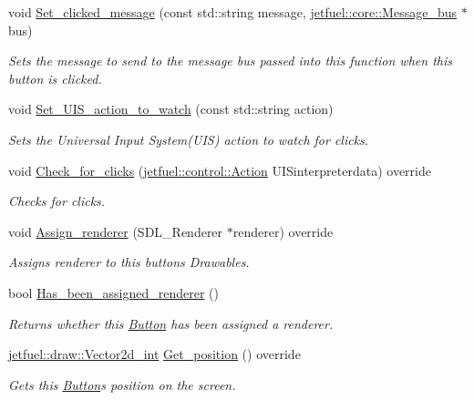 \begin{DoxyCompactItemize}
void \hyperlink{classjetfuel_1_1gui_1_1Button_a4b256fdcf0ae28d8fb258b0f89d19536}{Set\+\_\+clicked\+\_\+message} (const std\+::string message, \hyperlink{classjetfuel_1_1core_1_1Message__bus}{jetfuel\+::core\+::\+Message\+\_\+bus} $\ast$bus)
\begin{DoxyCompactList}\small\item\em Sets the message to send to the message bus passed into this function when this button is clicked. \end{DoxyCompactList}\item 
void \hyperlink{classjetfuel_1_1gui_1_1Button_a174b285f6271813e83fe277402ea3b8b}{Set\+\_\+\+U\+I\+S\+\_\+action\+\_\+to\+\_\+watch} (const std\+::string action)
\begin{DoxyCompactList}\small\item\em Sets the Universal Input System(\+U\+I\+S) action to watch for clicks. \end{DoxyCompactList}\item 
void \hyperlink{classjetfuel_1_1gui_1_1Button_ab80239583f2e515370a90771976c5265}{Check\+\_\+for\+\_\+clicks} (\hyperlink{structjetfuel_1_1control_1_1Action}{jetfuel\+::control\+::\+Action} U\+I\+Sinterpreterdata) override
\begin{DoxyCompactList}\small\item\em Checks for clicks. \end{DoxyCompactList}\item 
void \hyperlink{classjetfuel_1_1gui_1_1Button_aa566a1d59623fde8d062c3d02b6fd5f4}{Assign\+\_\+renderer} (S\+D\+L\+\_\+\+Renderer $\ast$renderer) override
\begin{DoxyCompactList}\small\item\em Assigns renderer to this button\textquotesingle{}s Drawables. \end{DoxyCompactList}\item 
bool \hyperlink{classjetfuel_1_1gui_1_1Button_a52c175819af166cda4c000fc2e32fb25}{Has\+\_\+been\+\_\+assigned\+\_\+renderer} ()
\begin{DoxyCompactList}\small\item\em Returns whether this \hyperlink{classjetfuel_1_1gui_1_1Button}{Button} has been assigned a renderer. \end{DoxyCompactList}\item 
\hyperlink{classjetfuel_1_1draw_1_1Vector2d}{jetfuel\+::draw\+::\+Vector2d\+\_\+int} \hyperlink{classjetfuel_1_1gui_1_1Button_aadcceacaabaa40bceb293d1f91231d22}{Get\+\_\+position} () override
\begin{DoxyCompactList}\small\item\em Gets this \hyperlink{classjetfuel_1_1gui_1_1Button}{Button}\textquotesingle{}s position on the screen. \end{DoxyCompactList}\item 

\end{DoxyCompactItemize}
